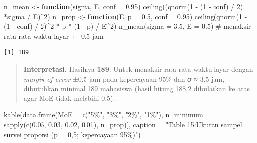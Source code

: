 \documentclass[
  indonesian,
  letterpaper,
]{book}
\newenvironment{Shaded}{\begin{snugshade}}{\end{snugshade}}
\newcommand{\AttributeTok}[1]{\textcolor[rgb]{0.40,0.45,0.13}{#1}}
\newcommand{\CommentTok}[1]{\textcolor[rgb]{0.37,0.37,0.37}{#1}}
\newcommand{\ControlFlowTok}[1]{\textcolor[rgb]{0.00,0.23,0.31}{\textbf{#1}}}
\newcommand{\DecValTok}[1]{\textcolor[rgb]{0.68,0.00,0.00}{#1}}
\newcommand{\FloatTok}[1]{\textcolor[rgb]{0.68,0.00,0.00}{#1}}
\newcommand{\FunctionTok}[1]{\textcolor[rgb]{0.28,0.35,0.67}{#1}}
\newcommand{\NormalTok}[1]{\textcolor[rgb]{0.00,0.23,0.31}{#1}}
\newcommand{\OtherTok}[1]{\textcolor[rgb]{0.00,0.23,0.31}{#1}}
\newcommand{\SpecialCharTok}[1]{\textcolor[rgb]{0.37,0.37,0.37}{#1}}
\newcommand{\StringTok}[1]{\textcolor[rgb]{0.13,0.47,0.30}{#1}}
\begin{document}
\begin{Shaded}
\begin{Highlighting}[]
\NormalTok{n\_mean }\OtherTok{\textless{}{-}} \ControlFlowTok{function}\NormalTok{(sigma, E, }\AttributeTok{conf =} \FloatTok{0.95}\NormalTok{) }\FunctionTok{ceiling}\NormalTok{((}\FunctionTok{qnorm}\NormalTok{(}\DecValTok{1} \SpecialCharTok{{-}}\NormalTok{ (}\DecValTok{1} \SpecialCharTok{{-}}\NormalTok{ conf) }\SpecialCharTok{/} \DecValTok{2}\NormalTok{) }\SpecialCharTok{*}\NormalTok{sigma }\SpecialCharTok{/}\NormalTok{ E)}\SpecialCharTok{\^{}}\DecValTok{2}\NormalTok{)}
\NormalTok{n\_prop }\OtherTok{\textless{}{-}} \ControlFlowTok{function}\NormalTok{(E, }\AttributeTok{p =} \FloatTok{0.5}\NormalTok{, }\AttributeTok{conf =} \FloatTok{0.95}\NormalTok{) }\FunctionTok{ceiling}\NormalTok{(}\FunctionTok{qnorm}\NormalTok{(}\DecValTok{1} \SpecialCharTok{{-}}\NormalTok{ (}\DecValTok{1} \SpecialCharTok{{-}}\NormalTok{ conf) }\SpecialCharTok{/} \DecValTok{2}\NormalTok{)}\SpecialCharTok{\^{}}\DecValTok{2} \SpecialCharTok{*}\NormalTok{ p }\SpecialCharTok{*}\NormalTok{ (}\DecValTok{1} \SpecialCharTok{{-}}\NormalTok{ p) }\SpecialCharTok{/}\NormalTok{ E}\SpecialCharTok{\^{}}\DecValTok{2}\NormalTok{)}
\FunctionTok{n\_mean}\NormalTok{(}\AttributeTok{sigma =} \FloatTok{3.5}\NormalTok{, }\AttributeTok{E =} \FloatTok{0.5}\NormalTok{) }\CommentTok{\# menaksir rata{-}rata waktu layar +{-} 0,5 jam}
\end{Highlighting}
\end{Shaded}

\begin{verbatim}
[1] 189
\end{verbatim}

\begin{quote}
\textbf{Interpretasi.} Hasilnya \textbf{189}. Untuk menaksir rata-rata
waktu layar dengan \emph{margin of error} ±0,5 jam pada kepercayaan 95\%
dan 𝜎 ≈ 3,5 jam, dibutuhkan minimal 189 mahasiswa (hasil hitung 188,2
dibulatkan ke atas agar MoE tidak melebihi 0,5).
\end{quote}

\begin{Shaded}
\begin{Highlighting}[]
\FunctionTok{kable}\NormalTok{(}\FunctionTok{data.frame}\NormalTok{(}\AttributeTok{MoE =} \FunctionTok{c}\NormalTok{(}\StringTok{"5\%"}\NormalTok{, }\StringTok{"3\%"}\NormalTok{, }\StringTok{"2\%"}\NormalTok{, }\StringTok{"1\%"}\NormalTok{),}
\AttributeTok{n\_minimum =} \FunctionTok{sapply}\NormalTok{(}\FunctionTok{c}\NormalTok{(}\FloatTok{0.05}\NormalTok{, }\FloatTok{0.03}\NormalTok{, }\FloatTok{0.02}\NormalTok{, }\FloatTok{0.01}\NormalTok{), n\_prop)),}
\AttributeTok{caption =} \StringTok{"Table 15:Ukuran sampel survei proporsi (p = 0,5; kepercayaan 95\%)"}\NormalTok{)}
\end{Highlighting}
\end{Shaded}
\end{document}

